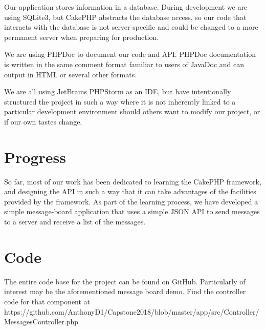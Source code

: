 \documentclass[11pt]{article}
\begin{document}
Our application stores information in a database. During development we are using SQLite3, but CakePHP abstracts the database access, so our code that interacts with the database is not server-specific and could be changed to a more permanent server when preparing for production.

We are using PHPDoc to document our code and API. PHPDoc documentation is written in the same comment format familiar to users of JavaDoc and can output in HTML or several other formats.

We are all using JetBrains PHPStorm as an IDE, but have intentionally structured the project in such a way where it is not inherently linked to a particular development environment should others want to modify our project, or if our own tastes change.

\section*{Progress}
So far, most of our work has been dedicated to learning the CakePHP framework, and designing the API in such a way that it can take advantages of the facilities provided by the framework. As part of the learning process, we have developed a simple message-board application that uses a simple JSON API to send messages to a server and receive a list of the messages.

\section*{Code}
The entire code base for the project can be found on GitHub. Particularly of interest may be the aforementioned message board demo. Find the controller code for that component at\\https://github.com/AnthonyD1/Capstone2018/blob/master/app/src/Controller/MessagesController.php
\end{document}
